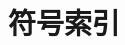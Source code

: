 \chapter*{符号索引}

\newcommand{\pg}[1]{第~\pageref{#1}页}
\newcommand{\symbolindex}[2]{\hbox{\makebox[0.2\textwidth][s]{#1\hfill}\hspace*{2.5em}\parbox[t]{0.65\textwidth}{#2\hfill}}\\[1.5pt]}


